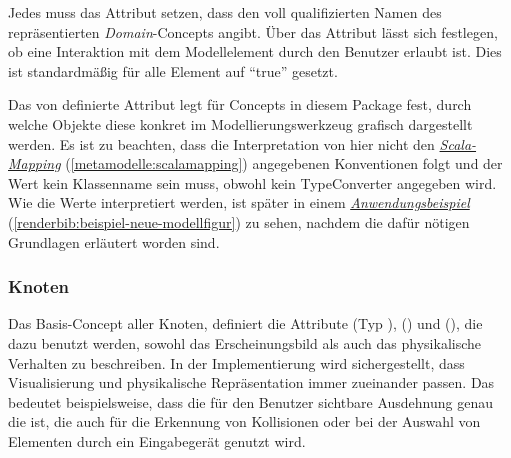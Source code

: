 \documentclass[a4paper,10pt]{sphinxmanual}
\begin{document}
Jedes  muss das Attribut  setzen, dass den voll qualifizierten Namen des repräsentierten \emph{Domain}-Concepts angibt.
Über das Attribut  lässt sich festlegen, ob eine Interaktion mit dem Modellelement durch den Benutzer erlaubt ist. Dies ist standardmäßig für alle Element auf "`true"' gesetzt.

Das von  definierte Attribut  legt für Concepts in diesem Package fest, durch welche Objekte diese konkret im Modellierungswerkzeug grafisch dargestellt werden.
Es ist zu beachten, dass die Interpretation von  hier nicht den {\hyperref[metamodelle:scalamapping]{\emph{Scala-Mapping}}} (\autoref*{metamodelle:scalamapping}) angegebenen Konventionen folgt und der Wert kein Klassenname sein muss, obwohl kein TypeConverter angegeben wird.
Wie die Werte interpretiert werden, ist später in einem {\hyperref[renderbib:beispiel-neue-modellfigur]{\emph{Anwendungsbeispiel}}} (\autoref*{renderbib:beispiel-neue-modellfigur}) zu sehen, nachdem die dafür nötigen Grundlagen erläutert worden sind.


\subsubsection{Knoten}
\label{metamodelle:knoten}
Das Basis-Concept aller Knoten,  definiert die Attribute  (Typ ),  () und  (), die dazu benutzt werden, sowohl das Erscheinungsbild als auch das physikalische Verhalten zu beschreiben.
In der Implementierung wird sichergestellt, dass Visualisierung und physikalische Repräsentation immer zueinander passen.
Das bedeutet beispielsweise, dass die für den Benutzer sichtbare Ausdehnung genau die ist, die auch für die Erkennung von Kollisionen oder bei der Auswahl von Elementen durch ein Eingabegerät genutzt wird.
\end{document}
